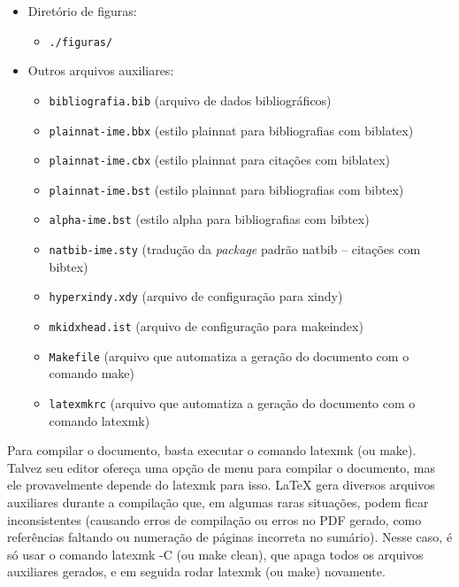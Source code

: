 \begin{itemize}
  \item Diretório de figuras:
  \begin{itemize}
    \item \texttt{./figuras/}
  \end{itemize}

  \item Outros arquivos auxiliares:
  \begin{itemize}
    \item \texttt{bibliografia.bib} (arquivo de dados bibliográficos)
    \item \texttt{plainnat-ime.bbx} (estilo plainnat para bibliografias com biblatex)
    \item \texttt{plainnat-ime.cbx} (estilo plainnat para citações com biblatex)
    \item \texttt{plainnat-ime.bst} (estilo plainnat para bibliografias com bibtex)
    \item \texttt{alpha-ime.bst} (estilo alpha para bibliografias com bibtex)
    \item \texttt{natbib-ime.sty} (tradução da \textit{package} padrão natbib -- citações com bibtex)
    \item \texttt{hyperxindy.xdy} (arquivo de configuração para xindy)
    \item \texttt{mkidxhead.ist} (arquivo de configuração para makeindex)
    \item \texttt{Makefile} (arquivo que automatiza a geração do documento com o comando \textsf{make})
    \item \texttt{latexmkrc} (arquivo que automatiza a geração do documento com o comando \textsf{latexmk})
  \end{itemize}
\end{itemize}

Para compilar o documento, basta executar o comando \textsf{latexmk} (ou
\textsf{make}). Talvez seu editor ofereça uma opção de menu para compilar o
documento, mas ele provavelmente depende do \textsf{latexmk} para isso.
\LaTeX{} gera diversos arquivos auxiliares durante a compilação que, em
algumas raras situações, podem ficar inconsistentes (causando erros de
compilação ou erros no PDF gerado, como referências faltando ou numeração de
páginas incorreta no sumário). Nesse caso, é só usar o comando
\textsf{latexmk -C} (ou \textsf{make clean}), que apaga todos os arquivos
auxiliares gerados, e em seguida rodar \textsf{latexmk} (ou \textsf{make})
novamente.

